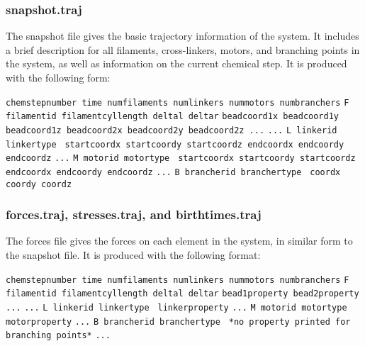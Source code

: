 \documentclass[11pt, oneside]{article}   	%
\begin{document}
\subsubsection{snapshot.traj}
The snapshot file gives the basic trajectory information of the system. It includes a brief description for all filaments, cross-linkers, motors, and branching points in the system, as well as information on the current chemical step. It is produced with the following form:\newline

\noindent\texttt{chemstepnumber time numfilaments numlinkers nummotors numbranchers}\newline
\texttt{F filamentid filamentcyllength deltal deltar}\newline
\texttt{beadcoord1x beadcoord1y beadcoord1z beadcoord2x beadcoord2y beadcoord2z ...}\newline
\texttt{...}\newline
\texttt{L linkerid linkertype }\newline
\texttt{startcoordx startcoordy startcoordz endcoordx endcoordy endcoordz}\newline
\texttt{...}\newline
\texttt{M motorid motortype }\newline
\texttt{startcoordx startcoordy startcoordz endcoordx endcoordy endcoordz}\newline
\texttt{...}\newline
\texttt{B brancherid branchertype }\newline
\texttt{coordx coordy coordz}\newline

\subsubsection{forces.traj, stresses.traj, and birthtimes.traj}

The forces file gives the forces on each element in the system, in similar form to the snapshot file. It is produced with the following format:\newline

\noindent\texttt{chemstepnumber time numfilaments numlinkers nummotors numbranchers}\newline
\texttt{F filamentid filamentcyllength deltal deltar}\newline
\texttt{bead1property bead2property ...}\newline
\texttt{...}\newline
\texttt{L linkerid linkertype }\newline
\texttt{linkerproperty}\newline
\texttt{...}\newline
\texttt{M motorid motortype }\newline
\texttt{motorproperty}\newline
\texttt{...}\newline
\texttt{B brancherid branchertype }\newline
\texttt{*no property printed for branching points*}\newline
\texttt{...}\newline
\end{document}

